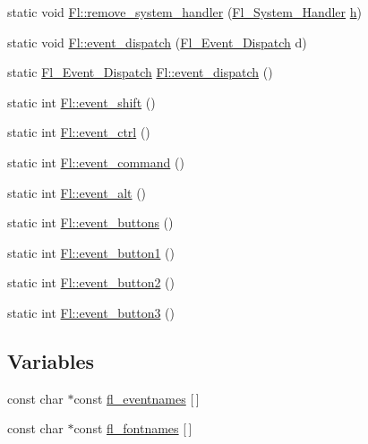 \begin{DoxyCompactItemize}
\item 
static void \hyperlink{group__fl__events_gab3fbca8031df48ec14b074e7c32c7a4f}{Fl\+::remove\+\_\+system\+\_\+handler} (\hyperlink{group__callback__functions_ga0cd86d9a18073304779213e82747ac8a}{Fl\+\_\+\+System\+\_\+\+Handler} \hyperlink{group__fl__screen_ga0a9410a98136445bacce42b2e3ad4e84}{h})
\item 
static void \hyperlink{group__fl__events_gadc295f82cebbec5cd0680b2190dc9a7d}{Fl\+::event\+\_\+dispatch} (\hyperlink{group__callback__functions_ga2fa80da592860bc4c0c1a06d36262601}{Fl\+\_\+\+Event\+\_\+\+Dispatch} d)
\item 
static \hyperlink{group__callback__functions_ga2fa80da592860bc4c0c1a06d36262601}{Fl\+\_\+\+Event\+\_\+\+Dispatch} \hyperlink{group__fl__events_gaabe317fed6cbd8f666e19feac9ecab13}{Fl\+::event\+\_\+dispatch} ()
\item 
static int \hyperlink{group__fl__events_gabd68dc8a592e9a2a41b42cb7e3a30060}{Fl\+::event\+\_\+shift} ()
\item 
static int \hyperlink{group__fl__events_gace54a534aad4a88dac170871a5bcbe1a}{Fl\+::event\+\_\+ctrl} ()
\item 
static int \hyperlink{group__fl__events_ga73da625a4d77f730da5e0bd0e8823be9}{Fl\+::event\+\_\+command} ()
\item 
static int \hyperlink{group__fl__events_ga1ee32cc3de557d5a1cc81a1eab944929}{Fl\+::event\+\_\+alt} ()
\item 
static int \hyperlink{group__fl__events_gaee06c25589974fafb1c8df8d0e2c7c80}{Fl\+::event\+\_\+buttons} ()
\item 
static int \hyperlink{group__fl__events_ga6ec5fa15a7ea5229cbff8dd507130d46}{Fl\+::event\+\_\+button1} ()
\item 
static int \hyperlink{group__fl__events_gad85ae7c11308de6e4653a860729dec77}{Fl\+::event\+\_\+button2} ()
\item 
static int \hyperlink{group__fl__events_ga70f54fbed74f801495575939dc787361}{Fl\+::event\+\_\+button3} ()
\end{DoxyCompactItemize}
\subsection*{Variables}
\begin{DoxyCompactItemize}
\item 
const char $\ast$const \hyperlink{group__fl__events_gafae60209182e08e80094cde8905d3521}{fl\+\_\+eventnames} \mbox{[}$\,$\mbox{]}
\item 
const char $\ast$const \hyperlink{group__fl__events_ga5b66307b326bb1fd02b93b470a7b849d}{fl\+\_\+fontnames} \mbox{[}$\,$\mbox{]}
\end{DoxyCompactItemize}


